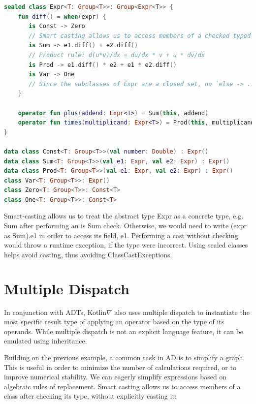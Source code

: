 \documentclass[12pt,initial,twoside,maitrise]{dms}
\numberwithin{equation}{section}
\numberwithin{table}{chapter}
\numberwithin{figure}{chapter}
\begin{document}
\begin{lstlisting}[caption={Users must handle all subclasses when branching on the type of a sealed class, as incomplete control flow will not compile (instead of failing silently at runtime).}, language=Kotlin]
sealed class Expr<T: Group<T>>: Group<Expr<T>> {
    fun diff() = when(expr) {
       is Const -> Zero
       // Smart casting allows us to access members of a checked typed without explicit casting
       is Sum -> e1.diff() + e2.diff()
       // Product rule: d(u*v)/dx = du/dx * v + u * dv/dx
       is Prod -> e1.diff() * e2 + e1 * e2.diff()
       is Var -> One
       // Since the subclasses of Expr are a closed set, no `else -> ...` is required.
    }

    operator fun plus(addend: Expr<T>) = Sum(this, addend)
    operator fun times(multiplicand: Expr<T>) = Prod(this, multiplicand)
}

data class Const<T: Group<T>>(val number: Double) : Expr()
data class Sum<T: Group<T>>(val e1: Expr, val e2: Expr) : Expr()
data class Prod<T: Group<T>>(val e1: Expr, val e2: Expr) : Expr()
class Var<T: Group<T>>: Expr()
class Zero<T: Group<T>>: Const<T>
class One<T: Group<T>>: Const<T>
\end{lstlisting}

Smart-casting allows us to treat the abstract type Expr as a concrete type, e.g. Sum after performing an is Sum check. Otherwise, we would need to write (expr as Sum).e1 in order to access its field, e1. Performing a cast without checking would throw a runtime exception, if the type were incorrect. Using sealed classes helps avoid casting, thus avoiding ClassCastExceptions.

\section{Multiple Dispatch}\label{sec:multiple-dispatch}

In conjunction with ADTs, Kotlin$\nabla$ also uses multiple dispatch to instantiate the most specific result type of applying an operator based on the type of its operands. While multiple dispatch is not an explicit language feature, it can be emulated using inheritance.

Building on the previous example, a common task in AD is to simplify a graph. This is useful in order to minimize the number of calculations required, or to improve numerical stability. We can eagerly simplify expressions based on algebraic rules of replacement. Smart casting allows us to access members of a class after checking its type, without explicitly casting it:
\end{document}
